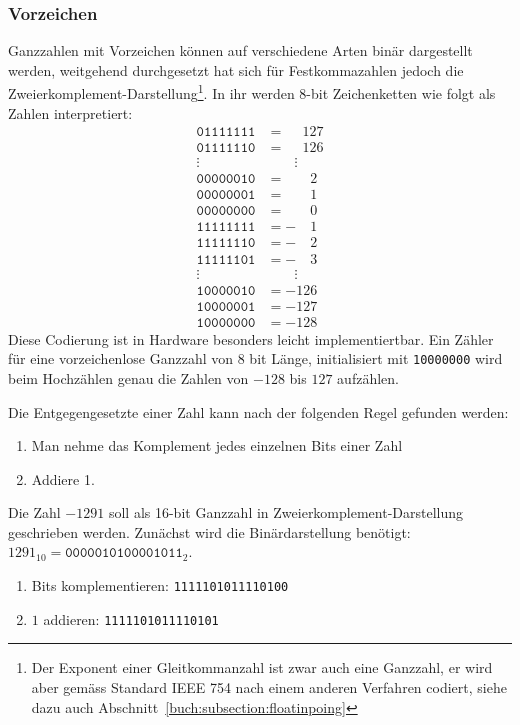 \subsubsection{Vorzeichen}
%
Ganzzahlen mit Vorzeichen können auf verschiedene Arten binär dargestellt
werden, weitgehend durchgesetzt hat sich für Festkommazahlen jedoch die
Zweierkomplement-Darstellung\footnote{Der Exponent einer Gleitkommanzahl
ist zwar auch eine Ganzzahl, er wird aber gemäss Standard IEEE 754
%
nach einem anderen Verfahren codiert, siehe dazu auch
Abschnitt~\ref{buch:subsection:floatinpoing}}.
%
In ihr werden 8-bit Zeichenketten wie folgt als Zahlen interpretiert:
\begin{align*}
\texttt{01111111}&= \phantom{-}127\\
\texttt{01111110}&= \phantom{-}126\\
\vdots\quad&\qquad\vdots\\
\texttt{00000010}&= \phantom{-00}2\\
\texttt{00000001}&= \phantom{-00}1\\
\texttt{00000000}&= \phantom{-00}0\\
\texttt{11111111}&= -\phantom{00}1\\
\texttt{11111110}&= -\phantom{00}2\\
\texttt{11111101}&= -\phantom{00}3\\
\vdots\quad&\qquad\vdots\\
\texttt{10000010}&=-126\\
\texttt{10000001}&=-127\\
\texttt{10000000}&=-128
\end{align*}
Diese Codierung ist in Hardware besonders leicht implementiertbar.
Ein Zähler für eine vorzeichenlose Ganzzahl von 8 bit Länge, initialisiert
mit \texttt{10000000} wird beim Hochzählen genau die Zahlen von $-128$
bis $127$ aufzählen.

Die Entgegengesetzte einer Zahl kann nach der folgenden Regel gefunden werden:
\begin{enumerate}
\item Man nehme das Komplement jedes einzelnen Bits einer Zahl
\item Addiere 1.
\end{enumerate}
\begin{beispiel}
Die Zahl $-1291$ soll als 16-bit Ganzzahl in Zweierkomplement-Darstellung
geschrieben werden.
Zunächst wird die Binärdarstellung benötigt:
$1291_{10}= \texttt{0000010100001011}_2$.
\begin{enumerate}
\item Bits komplementieren: \texttt{1111101011110100}
\item $1$ addieren: \texttt{1111101011110101}
\qedhere
\end{enumerate}
\end{beispiel}


